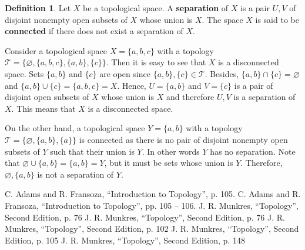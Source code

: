 \documentclass[a4paper, twocolumn]{article}
\newcommand{\topology}{\mathcal{T}}              %
\renewcommand{\emptyset}{\varnothing}            %
\newcommand\und[1]{\underline{\smash{#1}}}       %
\theoremstyle{definition}
\newtheorem*{definition}{Definition}
\begin{document}
\begin{definition}
\cite{7} Let $X$ be a topological space. A \textbf{separation} of $X$ is a pair $U, V$ of disjoint
nonempty open subsets of $X$ whose union is $X$. The space $X$ is said to be \textbf{connected}
if there does not exist a separation of $X$.
\end{definition}

Consider a topological space $X = \{a, b, c\}$ with a topology $\topology = \{\emptyset, \{a, b, c\}, \{a, b\}, \{c\}\}$.
Then it is easy to see that $X$ is a disconnected space. Sets $\{a, b\}$ and $\{c\}$ are open since $\{a, b\}, \{c\} \in \topology$.
Besides, $\{a, b\} \cap \{c\} = \emptyset$ and $\{a, b\} \cup \{c\} = \{a, b, c\} = X$.
Hence, $U = \{a, b\}$ and $V = \{c\}$ is a pair of disjoint open subsets of $X$ whose union is $X$
and therefore $U, V$ is a separation of $X$. This means that $X$ is a disconnected space.

\medskip

On the other hand, a topological space $Y = \{a, b\}$ with a topology $\topology = \{\emptyset, \{a, b\}, \{a\}\}$
is connected as there is no pair of disjoint nonempty open subsets of $Y$ such that their union is $Y$.
In other words $Y$ has no separation. Note that $\emptyset \cup \{a, b\} = \{a, b\} = Y$, but it must be \und{nonempty}
sets whose union is $Y$. Therefore, $\emptyset, \{a, b\}$ is not a separation of $Y$.

\medskip




\begin{center}
\begin{thebibliography}{00}
     C. Adams and R. Fransoza, ``Introduction to Topology'', p. 105.
     C. Adams and R. Fransoza, ``Introduction to Topology'', pp. 105 -- 106.
     J. R. Munkres, ``Topology'', Second Edition, p. 76
     J. R. Munkres, ``Topology'', Second Edition, p. 76
     J. R. Munkres, ``Topology'', Second Edition, p. 102
     J. R. Munkres, ``Topology'', Second Edition, p. 105
     J. R. Munkres, ``Topology'', Second Edition, p. 148
\end{thebibliography}
\end{center}
\end{document}

